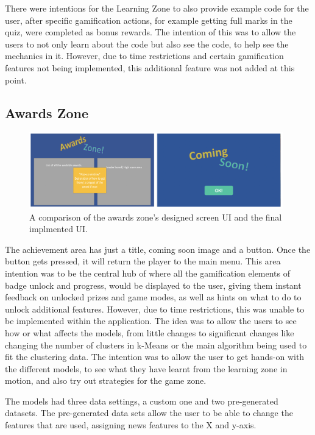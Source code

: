 	There were intentions for the Learning Zone to also provide example code for the user, after specific gamification actions, for example getting full marks in the quiz, were completed as bonus rewards. The intention of this was to allow the users to not only learn about the code but also see the code, to help see the mechanics in it. However, due to time restrictions and certain gamification features not being implemented, this additional feature was not added at this point.
	
	
	
	\subsection{Awards Zone}
	
	\begin{figure}[t]
		\begin{center}
			\includegraphics[width=11cm]{graphics/awards_zone.png}
			\caption{A comparison of the awards zone's designed screen UI and the final implmented UI.}
			\label{fig:ui_az}
		\end{center}
	\end{figure}
	
	
	The achievement area has just a title, coming soon image and a button. Once the button gets pressed, it will return the player to the main menu. This area intention was to be the central hub of where all the gamification elements of badge unlock and progress, would be displayed to the user, giving them instant feedback on unlocked prizes and game modes,  as well as hints on what to do to unlock additional features. However, due to time restrictions, this was unable to be implemented within the application. The idea was to allow the users to see how or what affects the models, from little changes to significant changes like changing the number of clusters in k-Means or the main algorithm being used to fit the clustering data. The intention was to allow the user to get hands-on with the different models, to see what they have learnt from the learning zone in motion, and also try out strategies for the game zone. 
	
	The models had three data settings, a custom one and two pre-generated datasets. The pre-generated data sets allow the user to be able to change the features that are used, assigning news features to the X and y-axis.
	
